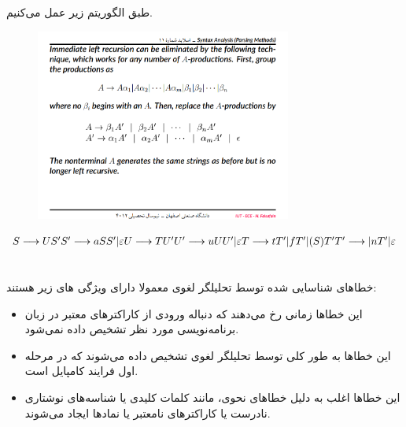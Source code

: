 \documentclass{article}
\begin{document}
\subsection{}
طبق الگوریتم زیر عمل می‌کنیم.
\begin{figure}[H]
    \centering
    \includegraphics[width=0.75\textwidth]{figures/1b.png}
    \caption
	{}
    \label{fig:fig1}
\end{figure}

\begin{latin}
$
S \longrightarrow US ^ \prime \\
S ^ \prime \longrightarrow aSS ^ \prime | \varepsilon \\
U \longrightarrow TU ^ \prime \\
U ^ \prime \longrightarrow uUU ^ \prime | \varepsilon \\
T \longrightarrow tT ^ \prime | fT ^ \prime | (S)T ^ \prime \\
T ^ \prime \longrightarrow | nT ^ \prime | \varepsilon
$
\end{latin}
















\section{}%
\subsection{}
خطاهای شناسایی شده توسط تحلیلگر لغوی معمولا دارای ویژگی های زیر هستند:
\begin{itemize}
\item این خطاها زمانی رخ می‌دهند که دنباله ورودی از کاراکترهای معتبر در زبان برنامه‌نویسی مورد نظر تشخیص داده نمی‌شود.
\item این خطاها به طور کلی توسط تحلیلگر لغوی تشخیص داده می‌شوند که در مرحله اول فرایند کامپایل است.
\item این خطاها اغلب به دلیل خطاهای نحوی، مانند کلمات کلیدی یا شناسه‌های نوشتاری نادرست یا کاراکترهای نامعتبر یا نمادها ایجاد می‌شوند.
\end{itemize}
\end{document}
